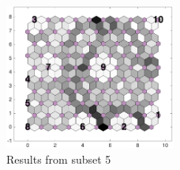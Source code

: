 \begin{figure}
        \centering
        \includegraphics[width=0.5\textwidth]{../../images0.01/M31/2D/image_subsets/subset3_dist_with_hits_t.png}
    \caption{Results from subset 5}
    \label{fig: subset3}
\end{figure}